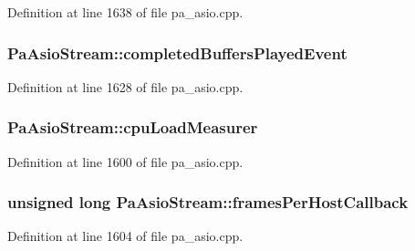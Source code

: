 Definition at line 1638 of file pa\+\_\+asio.\+cpp.

\subsubsection[{\texorpdfstring{completed\+Buffers\+Played\+Event}{completedBuffersPlayedEvent}}]{ Pa\+Asio\+Stream\+::completed\+Buffers\+Played\+Event}\hypertarget{struct_pa_asio_stream_acecaa140151e2d54cc9a904ec8d67244}{}\label{struct_pa_asio_stream_acecaa140151e2d54cc9a904ec8d67244}


Definition at line 1628 of file pa\+\_\+asio.\+cpp.

\subsubsection[{\texorpdfstring{cpu\+Load\+Measurer}{cpuLoadMeasurer}}]{ Pa\+Asio\+Stream\+::cpu\+Load\+Measurer}\hypertarget{struct_pa_asio_stream_a32a7ade601d41f7469a8eb14b3dd1828}{}\label{struct_pa_asio_stream_a32a7ade601d41f7469a8eb14b3dd1828}


Definition at line 1600 of file pa\+\_\+asio.\+cpp.

\subsubsection[{\texorpdfstring{frames\+Per\+Host\+Callback}{framesPerHostCallback}}]{\setlength{\rightskip}{0pt plus 5cm}unsigned long Pa\+Asio\+Stream\+::frames\+Per\+Host\+Callback}\hypertarget{struct_pa_asio_stream_a6a4170ebada9b0e6068a704cedae5cdb}{}\label{struct_pa_asio_stream_a6a4170ebada9b0e6068a704cedae5cdb}


Definition at line 1604 of file pa\+\_\+asio.\+cpp.

